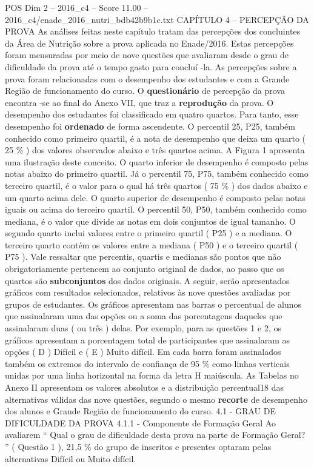 \begin{textsample}{POS Dim 2 – 2016\_c4 – Score 11.00 – 2016\_c4/enade\_2016\_nutri\_bdb42b9b1c.txt}  \label{ex:f2_pos_074}
CAPÍTULO 4 – PERCEPÇÃO DA PROVA As análises feitas neste capítulo tratam das percepções dos concluintes da Área de Nutrição sobre a prova aplicada no Enade/2016.
Estas percepções foram mensuradas por meio de nove questões que avaliaram desde o grau de dificuldade da prova até o tempo gasto para concluí -la.
As percepções sobre a prova foram relacionadas com o desempenho dos estudantes e com a Grande Região de funcionamento do curso.
O \textbf{questionário} de percepção da prova encontra -se ao final do Anexo VII, que traz a \textbf{reprodução} da prova.
O desempenho dos estudantes foi classificado em quatro quartos.
Para tanto, esse desempenho foi \textbf{ordenado} de forma ascendente.
O percentil 25, P25, também conhecido como primeiro quartil, é a nota de desempenho que deixa um quarto ( 25 \% ) dos valores observados abaixo e três quartos acima.
A Figura 1 apresenta uma ilustração deste conceito.
O quarto inferior de desempenho é composto pelas notas abaixo do primeiro quartil.
Já o percentil 75, P75, também conhecido como terceiro quartil, é o valor para o qual há três quartos ( 75 \% ) dos dados abaixo e um quarto acima dele.
O quarto superior de desempenho é composto pelas notas iguais ou acima do terceiro quartil.
O percentil 50, P50, também conhecido como mediana, é o valor que divide as notas em dois conjuntos de igual tamanho.
O segundo quarto inclui valores entre o primeiro quartil ( P25 ) e a mediana.
O terceiro quarto contém os valores entre a mediana ( P50 ) e o terceiro quartil ( P75 ).
Vale ressaltar que percentis, quartis e medianas são pontos que não obrigatoriamente pertencem ao conjunto original de dados, ao passo que os quartos são \textbf{subconjuntos} dos dados originais.
A seguir, serão apresentados gráficos com resultados selecionados, relativos às nove questões avaliadas por grupos de estudantes.
Os gráficos apresentam nas barras o percentual de alunos que assinalaram uma das opções ou a soma das porcentagens daqueles que assinalaram duas ( ou três ) delas.
Por exemplo, para as questões 1 e 2, os gráficos apresentam a porcentagem total de participantes que assinalaram as opções ( D ) Difícil e ( E ) Muito difícil.
Em cada barra foram assinalados também os extremos do intervalo de confiança de 95 \% como linhas verticais unidas por uma linha horizontal na forma da letra H maiúscula.
As Tabelas no Anexo II apresentam os valores absolutos e a distribuição percentual18 das alternativas válidas das nove questões, segundo o mesmo \textbf{recorte} de desempenho dos alunos e Grande Região de funcionamento do curso. 4.1 - GRAU DE DIFICULDADE DA PROVA 4.1.1 - Componente de Formação Geral Ao avaliarem “ Qual o grau de dificuldade desta prova na parte de Formação Geral? ” ( Questão 1 ), 21,5 \% do grupo de inscritos e presentes optaram pelas alternativas Difícil ou Muito difícil.

\end{textsample}
